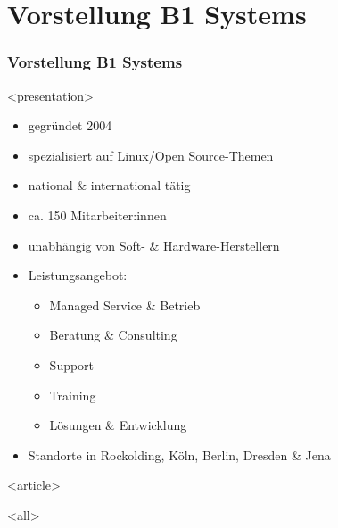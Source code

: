 
\section{Vorstellung B1 Systems}

\begin{frame}[fragile]
\frametitle<presentation>{Vorstellung B1 Systems}




\mode
<presentation>
\begin{itemize}
\item gegründet 2004
\item spezialisiert auf Linux/Open Source-Themen
\item national \& international tätig
\item ca. 150 Mitarbeiter:innen
\item unabhängig von Soft- \&  Hardware-Herstellern
\item Leistungsangebot:
  \begin{itemize}
  \item Managed Service \& Betrieb
  \item Beratung \& Consulting
  \item Support
  \item Training
  \item Lösungen \& Entwicklung
  \end{itemize}
\item Standorte in Rockolding, Köln, Berlin, Dresden \& Jena
\end{itemize}

\mode
<article>

\mode
<all>

\end{frame}
\newpage

